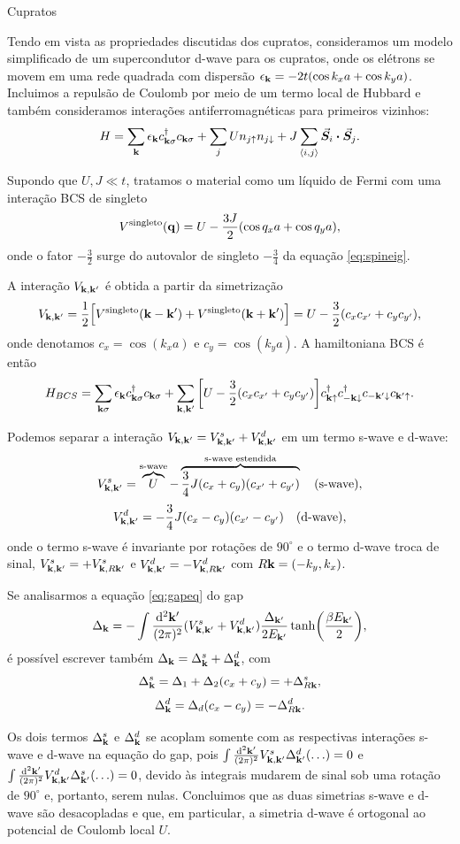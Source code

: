 \documentclass[a4paper,10pt]{article}
\begin{document}
\begin{section}{Cupratos}
\n

Tendo em vista as propriedades discutidas dos cupratos, consideramos um modelo simplificado de um supercondutor d-wave para os cupratos, onde os elétrons se movem em uma rede quadrada com dispersão $\epsilon_{\vb{k}} = -2t (\cos k_x a + \cos k_y a)$. Incluimos a repulsão de Coulomb por meio de um termo local de Hubbard e também consideramos interações antiferromagnéticas para primeiros vizinhos:
$$
H = \sum_{\k} \eps_{\k} c_{\k\s}^\d c_{\k\s} + \sum_{j} U n_{j\up} n_{j\down} + J \sum_{\nn{i}{j}} \va*{S}_i \vdot \va*{S}_j.
$$

Supondo que $U, J \ll t$, tratamos o material como um líquido de Fermi com uma interação BCS de singleto
$$
V^{\text{singleto}}(\vb{q}) = U - \frac{3J}{2} (\cos q_x a + \cos q_y a),
$$
onde o fator $-\frac{3}{2}$ surge do autovalor de singleto $-\frac{3}{4}$ da equação \ref{eq:spineig}.

\n

A interação $V_{\vb{k},\vb{k}'}$ é obtida a partir da simetrização
$$
V_{\vb{k},\vb{k}'} = \frac{1}{2}
\Big[
V^{\text{singleto}}(\vb{k}-\vb{k}') + V^{\text{singleto}}(\vb{k}+\vb{k}')
\Big] =
U - \frac{3}{2} (c_x c_{x'} + c_y c_{y'}),
$$
onde denotamos $c_x = \cos(k_x a)$ e $c_y = \cos(k_y a)$. A hamiltoniana BCS é então
$$
H_{BCS} = \sum_{\vb{k}\sigma} \epsilon_{\vb{k}} c_{\vb{k}\sigma}^\dagger c_{\vb{k}\sigma} +
\sum_{\vb{k},\vb{k}'} \qty[U - \frac{3}{2} (c_x c_{x'} + c_y c_{y'})]
c_{\vb{k}\uparrow}^\dagger c_{-\vb{k}\downarrow}^\dagger c_{-\vb{k}'\downarrow} c_{\vb{k}'\uparrow}.
$$


Podemos separar a interação $V_{\vb{k},\vb{k}'} = V_{\vb{k},\vb{k}'}^s + V_{\vb{k},\vb{k}'}^d$ em um termo s-wave e d-wave:
$$
V_{\vb{k},\vb{k}'}^s =
\overbrace{U}^{\text{s-wave}} -
\overbrace{\frac{3}{4} J (c_x + c_y) (c_{x'} + c_{y'})}^{\text{s-wave estendida}}
\quad \text{(s-wave)},
$$
$$
V_{\vb{k},\vb{k}'}^d = - \frac{3}{4} J (c_x - c_y) (c_{x'} - c_{y'})
\quad \text{(d-wave)},
$$
onde o termo s-wave é invariante por rotações de $90^\circ$ e o termo d-wave troca de sinal, $V_{\vb{k},\vb{k}'}^s = + V_{\vb{k}, R\vb{k}'}^s$ e $V_{\vb{k},\vb{k}'}^d = - V_{\vb{k}, R\vb{k}'}^d$ com $R\vb{k} = (-k_y, k_x)$.

\n

Se analisarmos a equação \ref{eq:gapeq} do gap
$$
\Delta_{\vb{k}} = - \int \frac{\dd[2]{\vb{k}'}}{(2\pi)^2} (V_{\vb{k},\vb{k}'}^s + V_{\vb{k},\vb{k}'}^d) \frac{\Delta_{\vb{k}'}}{2 E_{\vb{k}'}} \tanh(\frac{\beta E_{\vb{k}'}}{2}),
$$
é possível escrever também $\Delta_{\vb{k}} = \Delta_{\vb{k}}^s + \Delta_{\vb{k}}^d$, com
$$
\Delta_{\vb{k}}^s = \Delta_1 + \Delta_ 2 (c_x + c_y) = + \Delta_{R\vb{k}}^s,
$$
$$
\Delta_{\vb{k}}^d = \Delta_d (c_x - c_y) = - \Delta_{R\vb{k}}^d.
$$

Os dois termos $\Delta_{\vb{k}}^s$ e $\Delta_{\vb{k}}^d$ se acoplam somente com as respectivas interações s-wave e d-wave na equação do gap, pois $\int \frac{\dd[2]{\vb{k}'}}{(2\pi)^2} V_{\vb{k},\vb{k}'}^s \Delta^d_{\vb{k}'} (\ldots) = 0$ e $\int \frac{\dd[2]{\vb{k}'}}{(2\pi)^2} V_{\vb{k},\vb{k}'}^d \Delta^s_{\vb{k}'} (\ldots) = 0$, devido às integrais mudarem de sinal sob uma rotação de $90^\circ$ e, portanto, serem nulas. Concluimos que as duas simetrias s-wave e d-wave são desacopladas e que, em particular, a simetria d-wave é ortogonal ao potencial de Coulomb local $U$.



\end{section}
\end{document}
